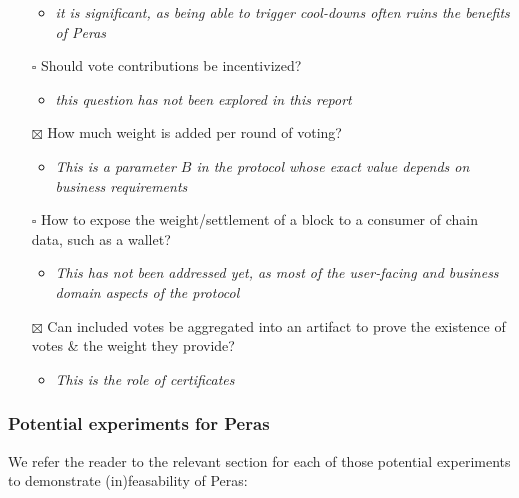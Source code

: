 \documentclass[10pt]{article}
\providecommand{\tightlist}{%
  \setlength{\itemsep}{0pt}\setlength{\parskip}{0pt}}
\begin{document}
\begin{itemize}
  \begin{itemize}
  \tightlist
  \item
    \emph{it is significant, as being able to trigger cool-downs often
    ruins the benefits of Peras}
  \end{itemize}
\item[$\square$]
  Should vote contributions be incentivized?

  \begin{itemize}
  \tightlist
  \item
    \emph{this question has not been explored in this report}
  \end{itemize}
\item[$\boxtimes$]
  How much weight is added per round of voting?

  \begin{itemize}
  \tightlist
  \item
    \emph{This is a parameter \(B\) in the protocol whose exact value
    depends on business requirements}
  \end{itemize}
\item[$\square$]
  How to expose the weight/settlement of a block to a consumer of chain
  data, such as a wallet?

  \begin{itemize}
  \tightlist
  \item
    \emph{This has not been addressed yet, as most of the user-facing
    and business domain aspects of the protocol}
  \end{itemize}
\item[$\boxtimes$]
  Can included votes be aggregated into an artifact to prove the
  existence of votes \& the weight they provide?

  \begin{itemize}
  \tightlist
  \item
    \emph{This is the role of certificates}
  \end{itemize}
\end{itemize}

\subsubsection{Potential experiments for
Peras}\label{potential-experiments-for-peras}

We refer the reader to the relevant section for each of those potential
experiments to demonstrate (in)feasability of Peras:
\end{document}
